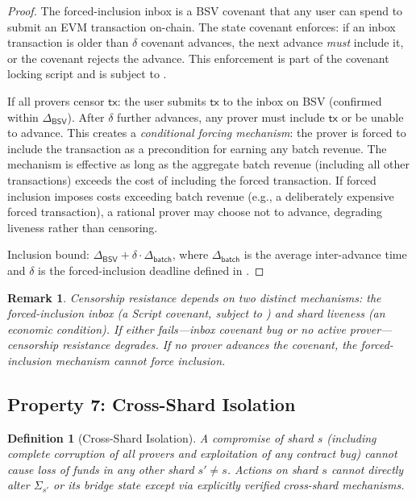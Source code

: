 \documentclass[11pt,a4paper]{article}
\newtheorem{definition}{Definition}[section]
\newtheorem{remark}{Remark}[section]
\newcommand{\BSV}{\mathsf{BSV}}
\begin{document}
\begin{proof}
The forced-inclusion inbox is a BSV covenant that any user can spend to submit an EVM transaction on-chain. The state covenant enforces: if an inbox transaction is older than $\delta$ covenant advances, the next advance \emph{must} include it, or the covenant rejects the advance. This enforcement is part of the covenant locking script and is subject to .

If all provers censor $\mathsf{tx}$: the user submits $\mathsf{tx}$ to the inbox on BSV (confirmed within $\Delta_{\BSV}$). After $\delta$ further advances, any prover must include $\mathsf{tx}$ or be unable to advance. This creates a \emph{conditional forcing mechanism}: the prover is forced to include the transaction as a precondition for earning any batch revenue. The mechanism is effective as long as the aggregate batch revenue (including all other transactions) exceeds the cost of including the forced transaction. If forced inclusion imposes costs exceeding batch revenue (e.g., a deliberately expensive forced transaction), a rational prover may choose not to advance, degrading liveness rather than censoring.

Inclusion bound: $\Delta_{\BSV} + \delta \cdot \Delta_{\mathsf{batch}}$, where $\Delta_{\mathsf{batch}}$ is the average inter-advance time and $\delta$ is the forced-inclusion deadline defined in . \qedhere
\end{proof}

\begin{remark}
Censorship resistance depends on two distinct mechanisms: the forced-inclusion inbox (a Script covenant, subject to ) and shard liveness (an economic condition). If either fails---inbox covenant bug or no active prover---censorship resistance degrades. If \emph{no} prover advances the covenant, the forced-inclusion mechanism cannot force inclusion.
\end{remark}


\subsection{Property 7: Cross-Shard Isolation}

\begin{definition}[Cross-Shard Isolation]\label{def:shard-iso}
A compromise of shard $s$ (including complete corruption of all provers and exploitation of any contract bug) cannot cause loss of funds in any other shard $s' \neq s$. Actions on shard $s$ cannot directly alter $\Sigma_{s'}$ or its bridge state except via explicitly verified cross-shard mechanisms.
\end{definition}
\end{document}
